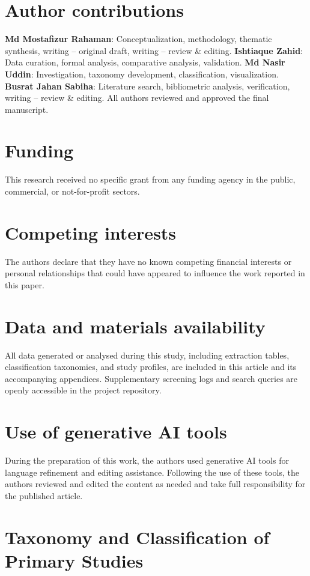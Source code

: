\IfFileExists{jair.cls}{\documentclass{jair}}{\documentclass[manuscript,nonacm,screen]{acmart}}
\begin{document}
\section*{Author contributions}
\textbf{Md Mostafizur Rahaman}: Conceptualization, methodology, thematic synthesis, writing -- original draft, writing -- review \& editing. \textbf{Ishtiaque Zahid}: Data curation, formal analysis, comparative analysis, validation. \textbf{Md Nasir Uddin}: Investigation, taxonomy development, classification, visualization. \textbf{Busrat Jahan Sabiha}: Literature search, bibliometric analysis, verification, writing -- review \& editing. All authors reviewed and approved the final manuscript.

\section*{Funding}
This research received no specific grant from any funding agency in the public, commercial, or not-for-profit sectors.

\section*{Competing interests}
The authors declare that they have no known competing financial interests or personal relationships that could have appeared to influence the work reported in this paper.

\section*{Data and materials availability}
All data generated or analysed during this study, including extraction tables, classification taxonomies, and study profiles, are included in this article and its accompanying appendices. Supplementary screening logs and search queries are openly accessible in the project repository.

\section*{Use of generative AI tools}
During the preparation of this work, the authors used generative AI tools for language refinement and editing assistance. Following the use of these tools, the authors reviewed and edited the content as needed and take full responsibility for the published article.

\appendix
\section{Taxonomy and Classification of Primary Studies}
\end{document}
